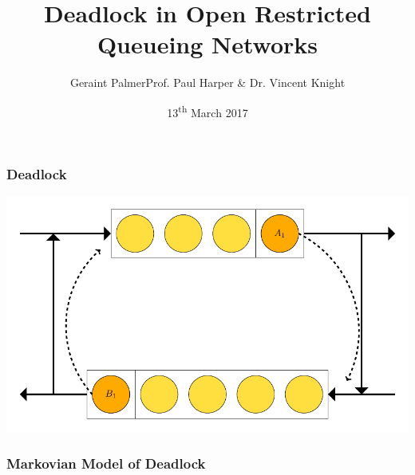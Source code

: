 \documentclass[xcolor={table}]{beamer}
\title{Deadlock in Open Restricted Queueing Networks}
\author{Geraint Palmer\newline \scriptsize{Prof. Paul Harper \& Dr. Vincent Knight}}
\date{13\textsuperscript{th} March 2017}
\begin{document}
\frame{\titlepage}

\begin{frame}
  \frametitle{Deadlock}
    \begin{figure}
    
    \end{figure}
\end{frame}

\begin{frame}
\includegraphics[width=\textwidth]{../images/2nodesindeadlock.pdf}
\end{frame}


\begin{frame}
    \begin{figure}
    
    \end{figure}
\end{frame}

\begin{frame}
    \frametitle{Markovian Model of Deadlock}
    \newline
\end{frame}
\end{document}
